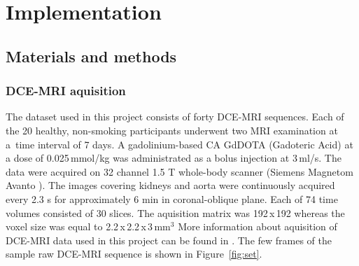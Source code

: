 \chapter{Implementation}

\section{Materials and methods}
\subsection{DCE-MRI aquisition}
The dataset used in this project consists of forty DCE-MRI sequences. Each of the 20 healthy, non-smoking participants underwent two MRI examination at a~time interval of 7 days.
A gadolinium-based CA GdDOTA (Gadoteric Acid) at a dose of 0.025\,mmol/kg was administrated as a bolus injection at 3\,ml/s.
The data were acquired on 32 channel 1.5 T whole-body scanner (Siemens Magnetom Avanto \cite{simens}).
The  images covering kidneys and aorta were continuously acquired every 2.3 s for approximately 6 min in coronal-oblique plane.
Each of 74 time volumes consisted of 30 slices.
The aquisition matrix was 192\,x\,192 whereas the voxel size was equal to 2.2\,x\,2.2\,x\,3\,mm$^3$
More information about aquisition of DCE-MRI data used in this project can be found in \cite{eikefjord2017dynamic}.
The few frames of the sample raw DCE-MRI sequence is shown in Figure~\ref{fig:set}.



